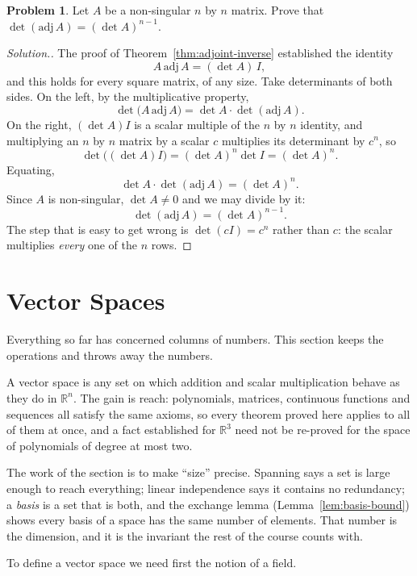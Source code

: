 \documentclass[11pt,a4paper]{article}
\theoremstyle{definition}
\newtheorem{problemx}{Problem}[section]
\newenvironment{problem}{\begin{problemx}}{\end{problemx}}
\newenvironment{solution}
  {\renewcommand{\qedsymbol}{}\begin{proof}[\textit{Solution}.]}
  {\end{proof}}
\begin{document}
\begin{problem}
Let $A$ be a non-singular $n$ by $n$ matrix. Prove that
$\det(\text{adj}\,A)=(\det A)^{n-1}$.
\end{problem}
\begin{solution}
The proof of Theorem~\ref{thm:adjoint-inverse} established the identity
$$A\,\text{adj}\,A=(\det A)\,I,$$
and this holds for every square matrix, of any size. Take determinants of both
sides. On the left, by the multiplicative property,
$$\det\big(A\,\text{adj}\,A\big)=\det A\cdot\det(\text{adj}\,A).$$
On the right, $(\det A)I$ is a scalar multiple of the $n$ by $n$ identity, and
multiplying an $n$ by $n$ matrix by a scalar $c$ multiplies its determinant by
$c^n$, so
$$\det\big((\det A)I\big)=(\det A)^n\det I=(\det A)^n.$$
Equating,
$$\det A\cdot\det(\text{adj}\,A)=(\det A)^n.$$
Since $A$ is non-singular, $\det A\neq 0$ and we may divide by it:
$$\det(\text{adj}\,A)=(\det A)^{n-1}.$$
The step that is easy to get wrong is $\det(cI)=c^n$ rather than $c$: the
scalar multiplies \emph{every} one of the $n$ rows.
\end{solution}

\pagebreak
\section{Vector Spaces}
Everything so far has concerned columns of numbers. This section keeps the
operations and throws away the numbers.

A vector space is any set on which addition and scalar multiplication behave as
they do in $\mathbb{R}^n$. The gain is reach: polynomials, matrices,
continuous functions and sequences all satisfy the same axioms, so every
theorem proved here applies to all of them at once, and a fact established for
$\mathbb{R}^3$ need not be re-proved for the space of polynomials of degree at
most two.

The work of the section is to make ``size'' precise. Spanning says a set is
large enough to reach everything; linear independence says it contains no
redundancy; a \emph{basis} is a set that is both, and the exchange lemma
(Lemma~\ref{lem:basis-bound}) shows every basis of a space has the same number
of elements. That number is the dimension, and it is the invariant the rest of
the course counts with.

To define a vector space we need first the notion of a field.
\end{document}
